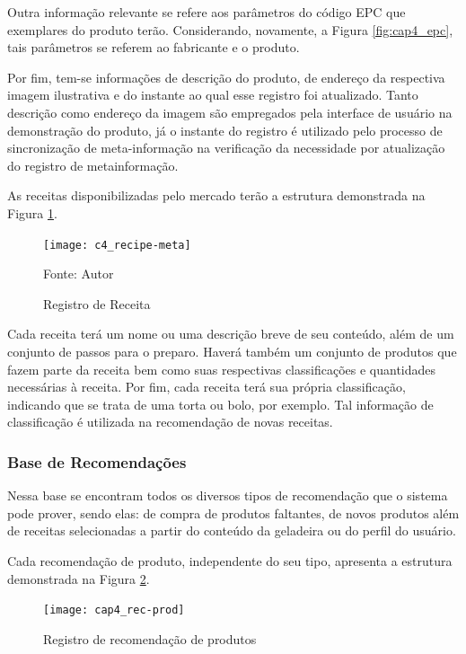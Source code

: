 Outra informação relevante se refere aos parâmetros do código EPC que exemplares do produto terão. Considerando, novamente, a Figura \ref{fig:cap4_epc}, tais parâmetros se referem ao fabricante e o produto.

Por fim, tem-se informações de descrição do produto, de endereço da respectiva imagem ilustrativa e do instante ao qual esse registro foi atualizado. Tanto descrição como endereço da imagem são empregados pela interface de usuário na demonstração do produto, já o instante do registro é utilizado pelo processo de sincronização de meta-informação na verificação da necessidade por atualização do registro de metainformação.

As receitas disponibilizadas pelo mercado terão a estrutura demonstrada na Figura \ref{fig:c4_recipe-meta}.

\begin{figure}[htb]
    \caption{Registro de Receita}
    \label{fig:c4_recipe-meta}
    \texttt{[image: c4\_recipe-meta]}
    
    Fonte: Autor
\end{figure}

Cada receita terá um nome ou uma descrição breve de seu conteúdo, além de um conjunto de passos para o preparo. Haverá também um conjunto de produtos que fazem parte da receita bem como suas respectivas classificações e quantidades necessárias à receita. Por fim, cada receita terá sua própria classificação, indicando que se trata de uma torta ou bolo, por exemplo. Tal informação de classificação é utilizada na recomendação de novas receitas.

\subsubsection{Base de Recomendações}


Nessa base se encontram todos os diversos tipos de recomendação que o sistema pode prover, sendo elas: de compra de produtos faltantes, de novos produtos além de receitas selecionadas a partir do conteúdo da geladeira ou do perfil do usuário.

Cada recomendação de produto, independente do seu tipo, apresenta a estrutura demonstrada na Figura \ref{fig:cap4_rec-prod}.

\begin{figure}[htb]
    \caption{Registro de recomendação de produtos}
    \label{fig:cap4_rec-prod}
    \texttt{[image: cap4\_rec-prod]}
\end{figure}

